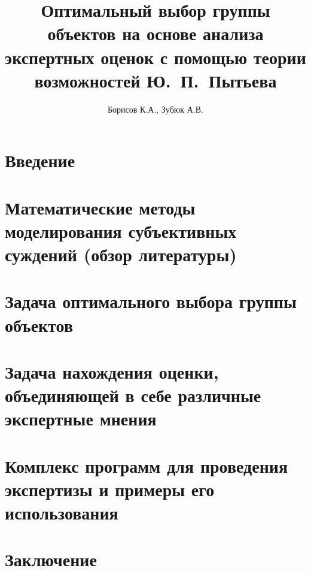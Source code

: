 \documentclass{article}
\begin{document}

\thispagestyle{empty}			

\title{Оптимальный выбор группы объектов на основе анализа экспертных оценок с помощью теории возможностей Ю.~П.~Пытьева} 
\author{Борисов К.А., Зубюк А.В.}
\maketitle

\tableofcontents
\newpage

\section{Введение} 


\section{Математические методы моделирования субъективных суждений (обзор литературы)}


\section{Задача оптимального выбора группы объектов}
% 

\section{Задача нахождения оценки, объединяющей в себе различные экспертные мнения}
% 

\section{Комплекс программ для проведения экспертизы и примеры его использования }
% 

\section{Заключение}
% 

\printbibliography[heading=bibintoc]
\end{document}
